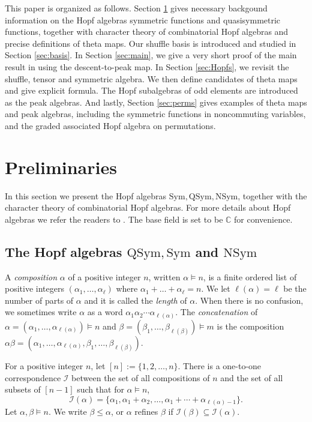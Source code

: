 \documentclass[12pt]{amsart}
\numberwithin{equation}{section}
\newcommand{\NSym}{\mathrm{NSym}}
\newcommand{\QSym}{\mathrm{QSym}}
\newcommand{\Sym}{\mathrm{Sym}}
\begin{document}
This paper is organized as follows. Section \ref{sec:prelim} gives necessary backgound information on the Hopf algebras symmetric functions and quasisymmetric functions, together with character theory of combinatorial Hopf algebras and precise definitions of theta maps. Our shuffle basis is introduced and studied in Section \ref{sec:basis}. In Section \ref{sec:main}, we give a very short proof of the main result in \cite{Z24} using the descent-to-peak map.  In Section \ref{sec:Hopfs}, we revisit the shuffle, tensor and symmetric algebra. We then define candidates of theta maps and give explicit formula. The Hopf subalgebras of odd elements are introduced as the peak algebras. And lastly, Section \ref{sec:perms} gives examples of theta maps and peak algebras, including the symmetric functions in noncommuting variables, and the graded associated Hopf algebra on permutations.


\section{Preliminaries}\label{sec:prelim}

In this section we present the Hopf algebras $\Sym, \QSym, \NSym$, together with the character theory of combinatorial Hopf algebras. For more details about Hopf algebras we refer the readers to \cite{G18}. The base field is set to be $\mathbb{C}$ for convenience.

\subsection{The Hopf algebras $\QSym, \Sym$ and $\NSym$}


A {\it composition} $\alpha$ of a positive integer $n$, written $\alpha \models n$, is a finite ordered list of positive integers $(\alpha_1,\ldots,\alpha_\ell)$ where $\alpha_1+\dots+\alpha_\ell=n$. We let $\ell(\alpha)=\ell$ be the number of parts of $\alpha$ and it is called the {\it length} of $\alpha$. 
When there is no confusion, we sometimes write $\alpha$ as a word $\alpha_1\alpha_2\cdots\alpha_{\ell(\alpha)}$. The {\it concatenation} of $\alpha=(\alpha_1,\ldots,\alpha_{\ell(\alpha)}) \models n$ and $\beta=(\beta_1,\ldots,\beta_{\ell(\beta)})\models m$  is the composition $\alpha  \beta=(\alpha_1,\ldots,\alpha_{\ell(\alpha)},\beta_1,\ldots,\beta_{\ell(\beta)})$.

For a positive integer $n$, let $[n]:=\{1,2,\ldots,n \}$. There is a one-to-one correspondence $\mathcal{I}$ between the set of all compositions of $n$ and the set of all subsets of $[n-1]$ such that  for $\alpha \models n$,
$$\mathcal{I}(\alpha)=\{ \alpha_1,\alpha_1+\alpha_2, \ldots,\alpha_1+\cdots+\alpha_{\ell(\alpha)-1} \}.$$
Let $\alpha,\beta\models n$. We write $\beta \leq \alpha$, or $\alpha$ refines $\beta$ if $\mathcal{I}(\beta)\subseteq \mathcal{I}(\alpha)$.\\
\end{document}
